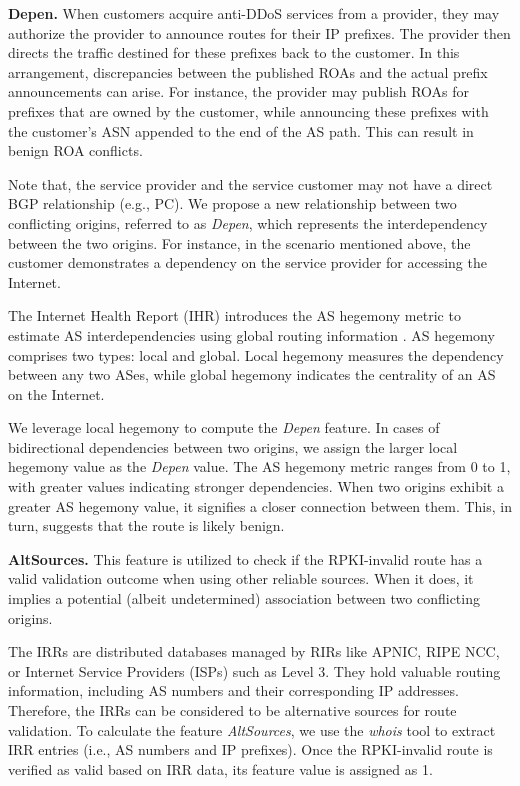 \noindent\textbf{Depen.}
When customers acquire anti-DDoS services from a provider, they may authorize the provider to announce routes for their IP prefixes. The provider then directs the traffic destined for these prefixes back to the customer. In this arrangement, discrepancies between the published ROAs and the actual prefix announcements can arise. For instance, the provider may publish ROAs for prefixes that are owned by the customer, while announcing these prefixes with the customer’s ASN appended to the end of the AS path. This can result in benign ROA conflicts.

Note that, the service provider and the service customer may not have a direct BGP relationship (e.g., PC). We propose a new relationship between two conflicting origins, referred to as \textit{Depen}, which represents the interdependency between the two origins. For instance, in the scenario mentioned above, the customer demonstrates a dependency on the service provider for accessing the Internet.

The Internet Health Report (IHR) \cite{IHR} introduces the AS hegemony metric to estimate AS interdependencies using global routing information \cite{fontugne2017hegemony,fontugne2018thin}. AS hegemony comprises two types: local and global. Local hegemony measures the dependency between any two ASes, while global hegemony indicates the centrality of an AS on the Internet. 

We leverage local hegemony to compute the \textit{Depen} feature. In cases of bidirectional dependencies between two origins, we assign the larger local hegemony value as the \textit{Depen} value.
The AS hegemony metric ranges from 0 to 1, with greater values indicating stronger dependencies.
When two origins exhibit a greater AS hegemony value, it signifies a closer connection between them. This, in turn, suggests that the route is likely benign.

\noindent\textbf{AltSources.} This feature is utilized to check if the RPKI-invalid route has a valid validation outcome when using other reliable sources. When it does, it implies a potential (albeit undetermined) association between two conflicting origins. 

The IRRs \cite{IRR} are distributed databases managed by RIRs like APNIC, RIPE NCC, or Internet Service Providers (ISPs) such as Level 3. They hold valuable routing information, including AS numbers and their corresponding IP addresses.
Therefore, the IRRs can be considered to be alternative sources for route validation. 
To calculate the feature \textit{AltSources}, we use the \textit{whois} tool to extract IRR entries (i.e., AS numbers and IP prefixes).
Once the RPKI-invalid route is verified as valid based on IRR data, its feature value is assigned as 1.

